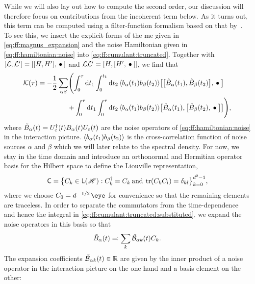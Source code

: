 While we will also lay out how to compute the second order, our discussion will therefore focus on contributions from the incoherent term below.
As it turns out, this term can be computed using a filter-function formalism based on that by~\textcite{Green2013}.
To see this, we insert the explicit forms of the \gls{me} given in \cref{eq:ff:magnus_expansion} and the noise Hamiltonian given in \cref{eq:ff:hamiltonian:noise} into \cref{eq:ff:cumulant:truncated}.
Together with $\comm{\mc{L}}{\mc{L}'} = \comm{\comm{H}{H'}}{\placeholder}$ and $\mc{L}\mc{L}' = \comm{H}{\comm{H'}{\placeholder}}$, we find that
\begin{align}
    \cumulantfun(\tau) = -\frac{1}{2}\sum_{\alpha\beta}\Biggl(\int_0^\tau\dd{t_1}\int_0^{t_1}\dd{t_2}
        \expval{b_\alpha(t_1) b_\beta(t_2)} & \comm{\comm{\tilde{B}_\alpha(t_1)}{\tilde{B}_\beta(t_2)}}{\placeholder} \notag\\
        +\int_0^\tau\dd{t_1}\int_0^\tau\dd{t_2}
        \expval{b_\alpha(t_1) b_\beta(t_2)} & \comm{\tilde{B}_\alpha(t_1)}{\comm{\tilde{B}_\beta(t_2)}{\placeholder}}\Biggr), \label{eq:ff:cumulant:truncated:substituted}
\end{align}
where $\tilde{B}_\alpha(t) = U_{\mathrm{c}}^\dagger(t)B_\alpha(t)U_{\mathrm{c}}(t)$ are the noise operators of \cref{eq:ff:hamiltonian:noise} in the interaction picture.
$\ev{b_\alpha(t_1)b_\beta(t_2)}$ is the cross-correlation function of noise sources $\alpha$ and $\beta$ which we will later relate to the spectral density.
For now, we stay in the time domain and introduce an orthonormal and Hermitian operator basis for the Hilbert space \Hspace to define the Liouville representation,
\begin{equation}\label{eq:ff:basis}
    \mathsf{C} = \bigl\lbrace C_k\in\mathsf{L}(\mathscr{H}): C_k^\dagger = C_k\:\text{and}\:\tr(C_k C_l) = \delta_{kl}\bigr\rbrace_{k=0}^{d^2-1},
\end{equation}
where we choose $C_0 = d^{-\flatfrac{1}{2}}\eye$ for convenience so that the remaining elements are traceless.
In order to separate the commutators from the time-dependence and hence the integral in \cref{eq:ff:cumulant:truncated:substituted}, we expand the noise operators in this basis so that
\begin{equation}\label{eq:ff:noise_operators:expanded}
    \tilde{B}_\alpha(t) \eqqcolon \sum_k\tilde{\mathcal{B}}_{\alpha k}(t) C_k.
\end{equation}
The expansion coefficients $\tilde{\mathcal{B}}_{\alpha k}(t)\in\mathbb{R}$ are given by the inner product of a noise operator in the interaction picture on the one hand and a basis element on the other:
